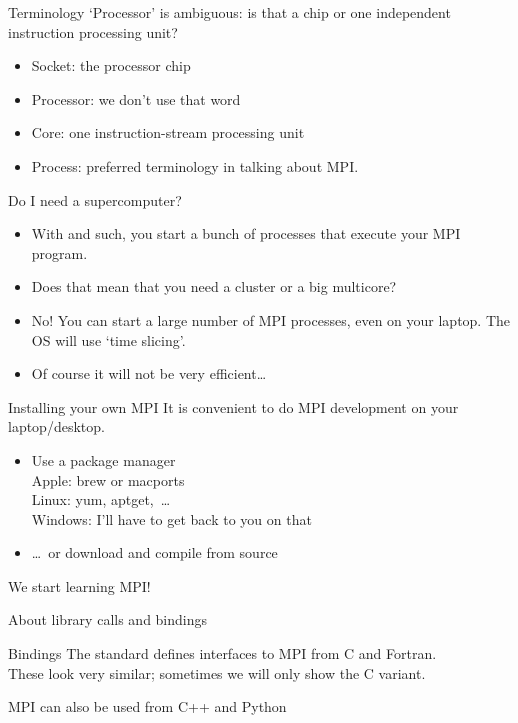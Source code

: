 \begin{numberedframe}{Terminology}
  `Processor' is ambiguous: is that a chip or one independent
  instruction processing unit?
  \begin{itemize}
  \item Socket: the processor chip
  \item Processor: we don't use that word
  \item Core: one instruction-stream processing unit
  \item Process: preferred terminology in talking about MPI.
  \end{itemize}  
\end{numberedframe}

\begin{numberedframe}{Do I need a supercomputer?}
  \begin{itemize}
  \item With  and such, you start a bunch of processes that
    execute your MPI program.
  \item Does that mean that you need a cluster or a big multicore?
  \item No! You can start a large number of MPI processes, even on
    your laptop. The OS will use `time slicing'.
  \item Of course it will not be very efficient\ldots
  \end{itemize}
\end{numberedframe}

\begin{numberedframe}{Installing your own MPI}
  It is convenient to do MPI development on your laptop/desktop.
  \begin{itemize}
  \item Use a package manager\\
    Apple: brew or macports\\
    Linux: yum, aptget,~\ldots\\
    Windows: I'll have to get back to you on that
  \item \ldots~or download and compile from source 
  \end{itemize}
\end{numberedframe}

 {We start learning MPI!}

 {About library calls and bindings}

\begin{numberedframe}{Bindings}
  The standard defines interfaces to MPI
  from C and Fortran.\\
  These look very similar;
  sometimes we will only show the C variant.

  MPI can also be used from C++ and Python
\end{numberedframe}

